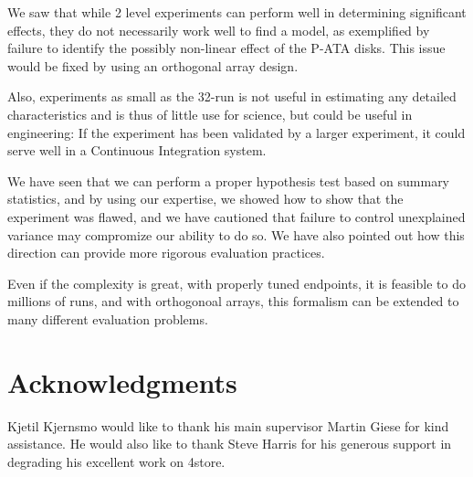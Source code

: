 \documentclass{llncs}
\begin{document}
We saw that while 2 level experiments can perform well in determining
significant effects, they do not necessarily work well to find a
model, as exemplified by failure to identify the possibly non-linear
effect of the P-ATA disks. This issue would be fixed by using an
orthogonal array design.

Also, experiments as small as the 32-run is not useful in estimating
any detailed characteristics and is thus of little use for science,
but could be useful in engineering: If the experiment has been
validated by a larger experiment, it could serve well in a Continuous
Integration system.

We have seen that we can perform a proper hypothesis test based on
summary statistics, and by using our expertise, we showed how to show
that the experiment was flawed, and we have cautioned that failure to
control unexplained variance may compromize our ability to do so. We
have also pointed out how this direction can provide more rigorous
evaluation practices.

Even if the complexity is great, with properly tuned endpoints, it is
feasible to do millions of runs, and with orthogonoal arrays, this
formalism can be extended to many different evaluation problems.



\section*{Acknowledgments}

Kjetil Kjernsmo would like to thank his main supervisor Martin Giese
for kind assistance. He would also like to
thank Steve Harris for his generous support in degrading his excellent
work on 4store.


%
%
%


\end{document}
